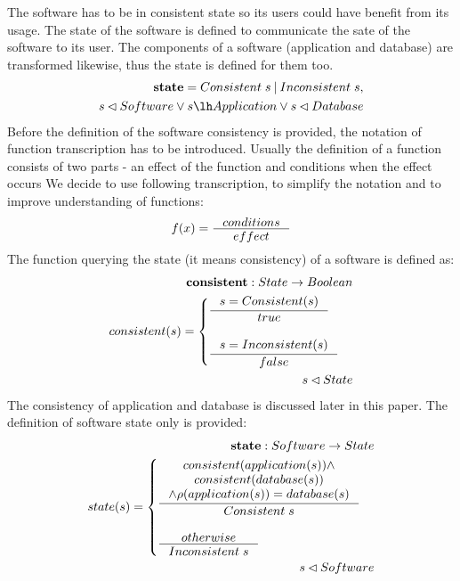 \documentclass[11pt]{article}
\begin{document}
The software has to be in consistent state so its users could have benefit from its usage. The state of the software is defined to communicate the sate of the software to its user. The components of a software (application and database) are transformed likewise, thus the state is defined for them too.
\begin{align*}
 	\mathbf{state} = Consistent\; s \: | \: Inconsistent \; s,  \\	s \lhd Software \vee s \lh Application \vee s \lhd Database
\end{align*}
Before the definition of the software consistency is provided, the notation of function transcription has to be introduced. Usually the definition of a function consists of two parts - an effect of the function and conditions when the effect occurs We decide to use following transcription, to simplify the notation and to improve understanding of functions:
\begin{align*}
f(x) =   \inference{conditions}{effect}
\end{align*}
The function querying the state (it means consistency) of a software is defined as:
\begin{align*}
 	\mathbf{consistent} : State \rightarrow Boolean \\
 	consistent(s) = \begin{cases}
 		\inference{s = Consistent(s)}{true}\\\\
 		\inference{s = Inconsistent(s)}{false}\\
 \end{cases}\\
 s \lhd State
\end{align*}
The consistency of application and database is discussed later in this paper. The definition of software state only is provided:
\begin{align*}
	\mathbf{state} : Software \rightarrow State \\
	state(s) = \begin{cases}
 		\inference{consistent(application(s)) \wedge \\ consistent(database(s)) \\ \wedge \rho(application(s)) = database(s)}{Consistent \; s}\\ \\
 		\inference{otherwise}{Inconsistent \; s}
 	\end{cases} \\ 
 	s \lhd Software
\end{align*}
\end{document}
